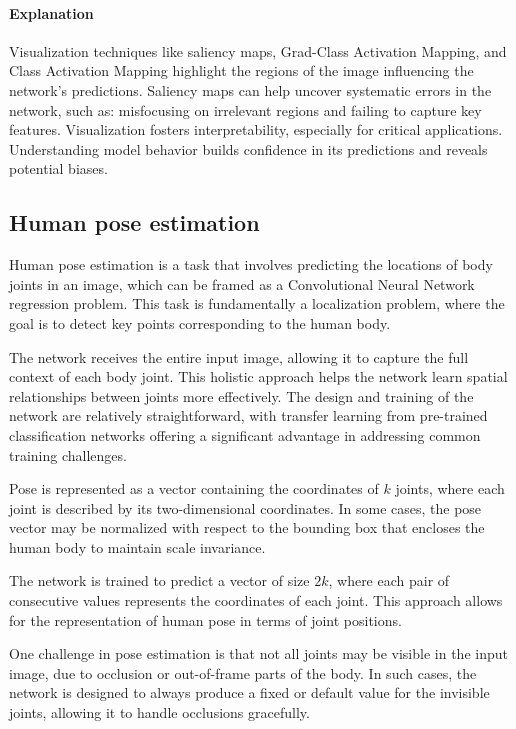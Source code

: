 \paragraph*{Explanation}
Visualization techniques like saliency maps, Grad-Class Activation Mapping, and Class Activation Mapping highlight the regions of the image influencing the network's predictions. 
Saliency maps can help uncover systematic errors in the network, such as: misfocusing on irrelevant regions and failing to capture key features.
Visualization fosters interpretability, especially for critical applications.
Understanding model behavior builds confidence in its predictions and reveals potential biases.

\subsection{Human pose estimation}
Human pose estimation is a task that involves predicting the locations of body joints in an image, which can be framed as a Convolutional Neural Network regression problem.
This task is fundamentally a localization problem, where the goal is to detect key points corresponding to the human body.

The network receives the entire input image, allowing it to capture the full context of each body joint. 
This holistic approach helps the network learn spatial relationships between joints more effectively. 
The design and training of the network are relatively straightforward, with transfer learning from pre-trained classification networks offering a significant advantage in addressing common training challenges.

Pose is represented as a vector containing the coordinates of $k$ joints, where each joint is described by its two-dimensional coordinates. 
In some cases, the pose vector may be normalized with respect to the bounding box that encloses the human body to maintain scale invariance.

The network is trained to predict a vector of size $2k$, where each pair of consecutive values represents the coordinates of each joint.
This approach allows for the representation of human pose in terms of joint positions.

One challenge in pose estimation is that not all joints may be visible in the input image, due to occlusion or out-of-frame parts of the body. 
In such cases, the network is designed to always produce a fixed or default value for the invisible joints, allowing it to handle occlusions gracefully.

